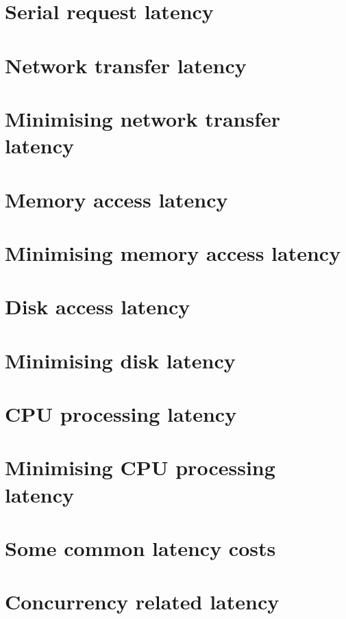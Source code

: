\documentclass[11pt]{article}
\begin{document}
\section{Serial request latency}

\section{Network transfer latency}

\section{Minimising network transfer latency}

\section{Memory access latency}

\section{Minimising memory access latency}

\section{Disk access latency}

\section{Minimising disk latency}

\section{CPU processing latency}

\section{Minimising CPU processing latency}

\section{Some common latency costs}

\section{Concurrency related latency}
\end{document}
